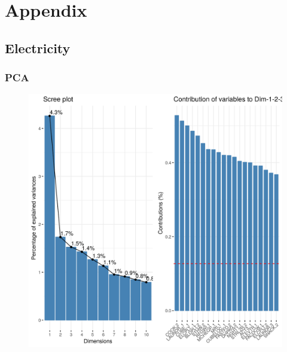 \section*{Appendix}

\appendix
\subsection*{Electricity}
\subsubsection*{PCA}
\label{appendix:electricity:pca}
\begin{figure}[h]
\includegraphics[width=\textwidth]{Images/electricity_pca.png}
\centering
\end{figure}
\label{appendix:electricity:pls}